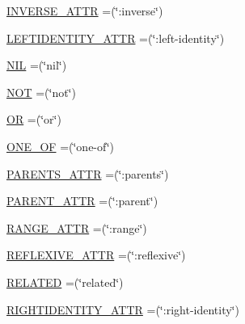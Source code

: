 \begin{DoxyCompactItemize}
\item 
\hyperlink{enumde_1_1uulm_1_1ecs_1_1ai_1_1owlapi_1_1krssrenderer_1_1_k_r_s_s2_vocabulary_a4afe633e94239847839d5cde5a023cd8}{I\-N\-V\-E\-R\-S\-E\-\_\-\-A\-T\-T\-R} =(\char`\"{}\-:inverse\char`\"{})
\item 
\hyperlink{enumde_1_1uulm_1_1ecs_1_1ai_1_1owlapi_1_1krssrenderer_1_1_k_r_s_s2_vocabulary_a41011b658b0a279aa5360b1955697551}{L\-E\-F\-T\-I\-D\-E\-N\-T\-I\-T\-Y\-\_\-\-A\-T\-T\-R} =(\char`\"{}\-:left-\/identity\char`\"{})
\item 
\hyperlink{enumde_1_1uulm_1_1ecs_1_1ai_1_1owlapi_1_1krssrenderer_1_1_k_r_s_s2_vocabulary_a7b55426b868dc32436bd524c9ece5dc6}{N\-I\-L} =(\char`\"{}nil\char`\"{})
\item 
\hyperlink{enumde_1_1uulm_1_1ecs_1_1ai_1_1owlapi_1_1krssrenderer_1_1_k_r_s_s2_vocabulary_a835605936030da335926353fb4827087}{N\-O\-T} =(\char`\"{}not\char`\"{})
\item 
\hyperlink{enumde_1_1uulm_1_1ecs_1_1ai_1_1owlapi_1_1krssrenderer_1_1_k_r_s_s2_vocabulary_ab0cf461096a52f2ccd7a2d2c8016111f}{O\-R} =(\char`\"{}or\char`\"{})
\item 
\hyperlink{enumde_1_1uulm_1_1ecs_1_1ai_1_1owlapi_1_1krssrenderer_1_1_k_r_s_s2_vocabulary_a1dd312646d851c60d7f16b0d35aae980}{O\-N\-E\-\_\-\-O\-F} =(\char`\"{}one-\/of\char`\"{})
\item 
\hyperlink{enumde_1_1uulm_1_1ecs_1_1ai_1_1owlapi_1_1krssrenderer_1_1_k_r_s_s2_vocabulary_a90a301171a588e31c6ded43ad7894bba}{P\-A\-R\-E\-N\-T\-S\-\_\-\-A\-T\-T\-R} =(\char`\"{}\-:parents\char`\"{})
\item 
\hyperlink{enumde_1_1uulm_1_1ecs_1_1ai_1_1owlapi_1_1krssrenderer_1_1_k_r_s_s2_vocabulary_afdab558c9727558273dee91ec19ea60c}{P\-A\-R\-E\-N\-T\-\_\-\-A\-T\-T\-R} =(\char`\"{}\-:parent\char`\"{})
\item 
\hyperlink{enumde_1_1uulm_1_1ecs_1_1ai_1_1owlapi_1_1krssrenderer_1_1_k_r_s_s2_vocabulary_a6d75aeaf5a6f791a7b96696e4f395876}{R\-A\-N\-G\-E\-\_\-\-A\-T\-T\-R} =(\char`\"{}\-:range\char`\"{})
\item 
\hyperlink{enumde_1_1uulm_1_1ecs_1_1ai_1_1owlapi_1_1krssrenderer_1_1_k_r_s_s2_vocabulary_a78da998bc93e12914912475f67e6ad5e}{R\-E\-F\-L\-E\-X\-I\-V\-E\-\_\-\-A\-T\-T\-R} =(\char`\"{}\-:reflexive\char`\"{})
\item 
\hyperlink{enumde_1_1uulm_1_1ecs_1_1ai_1_1owlapi_1_1krssrenderer_1_1_k_r_s_s2_vocabulary_abcd382e3b70dd86f03535a6e31e6b18e}{R\-E\-L\-A\-T\-E\-D} =(\char`\"{}related\char`\"{})
\item 
\hyperlink{enumde_1_1uulm_1_1ecs_1_1ai_1_1owlapi_1_1krssrenderer_1_1_k_r_s_s2_vocabulary_a0bed390a7e80acefda79c9cbd43bdf37}{R\-I\-G\-H\-T\-I\-D\-E\-N\-T\-I\-T\-Y\-\_\-\-A\-T\-T\-R} =(\char`\"{}\-:right-\/identity\char`\"{})

\end{DoxyCompactItemize}
